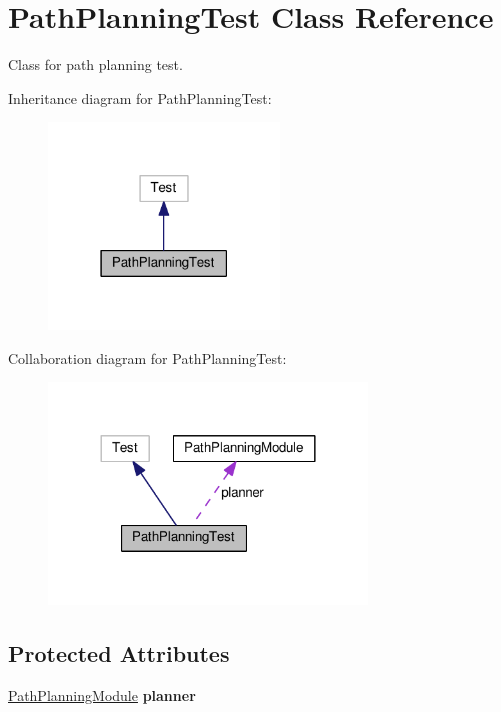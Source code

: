 \hypertarget{class_path_planning_test}{}\section{Path\+Planning\+Test Class Reference}
\label{class_path_planning_test}


Class for path planning test.  




Inheritance diagram for Path\+Planning\+Test\+:
\nopagebreak
\begin{figure}[H]
\begin{center}
\leavevmode
\includegraphics[width=174pt]{class_path_planning_test__inherit__graph}
\end{center}
\end{figure}


Collaboration diagram for Path\+Planning\+Test\+:
\nopagebreak
\begin{figure}[H]
\begin{center}
\leavevmode
\includegraphics[width=240pt]{class_path_planning_test__coll__graph}
\end{center}
\end{figure}
\subsection*{Protected Attributes}
\begin{DoxyCompactItemize}
\item 
\hyperlink{class_path_planning_module}{Path\+Planning\+Module} {\bfseries planner}\hypertarget{class_path_planning_test_af307c6073040bffa9d602969d81ae254}{}\label{class_path_planning_test_af307c6073040bffa9d602969d81ae254}

\end{DoxyCompactItemize}


